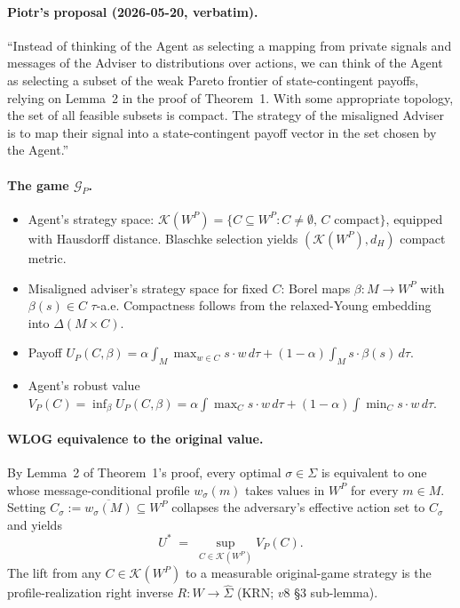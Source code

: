 \documentclass[11pt]{article}
\theoremstyle{definition}
\theoremstyle{remark}
\newcommand{\Si}{\Sigma}
\newcommand{\K}{\mathcal{K}}
\begin{document}
\paragraph{Piotr's proposal (2026-05-20, verbatim).} ``Instead of
thinking of the Agent as selecting a mapping from private signals and
messages of the Adviser to distributions over actions, we can think of
the Agent as selecting a subset of the weak Pareto frontier of
state-contingent payoffs, relying on Lemma~2 in the proof of
Theorem~1. With some appropriate topology, the set of all feasible
subsets is compact. The strategy of the misaligned Adviser is to map
their signal into a state-contingent payoff vector in the set chosen
by the Agent.''

\paragraph{The game $\mathcal G_P$.}
\begin{itemize}[leftmargin=*]
  \item Agent's strategy space: $\K(W^P) = \{C\subseteq W^P : C\ne\emptyset,\,C\text{ compact}\}$,
    equipped with Hausdorff distance. Blaschke selection yields
    $(\K(W^P), d_H)$ compact metric.
  \item Misaligned adviser's strategy space for fixed $C$: Borel maps
    $\beta:M\to W^P$ with $\beta(s)\in C$ $\tau$-a.e. Compactness follows
    from the relaxed-Young embedding into $\Delta(M\times C)$.
  \item Payoff $U_P(C,\beta) = \alpha\!\int_M\!\max_{w\in C}s\!\cdot w\,d\tau + (1-\alpha)\!\int_M s\!\cdot\beta(s)\,d\tau$.
  \item Agent's robust value $V_P(C) = \inf_\beta U_P(C,\beta) = \alpha\!\int\max_C s\!\cdot w\,d\tau + (1-\alpha)\!\int\min_C s\!\cdot w\,d\tau$.
\end{itemize}

\paragraph{WLOG equivalence to the original value.}
By Lemma~2 of Theorem~1's proof, every optimal $\sigma\in\Si$ is
equivalent to one whose message-conditional profile $w_\sigma(m)$ takes
values in $W^P$ for every $m\in M$. Setting $C_\sigma := \overline{w_\sigma(M)}\subseteq W^P$
collapses the adversary's effective action set to $C_\sigma$ and yields
\begin{equation}\label{eq:wlog}
  U^* \;=\; \sup_{C\in\K(W^P)}V_P(C).
\end{equation}
The lift from any $C\in\K(W^P)$ to a measurable original-game strategy
is the profile-realization right inverse $R:W\to\hat\Si$ (KRN; $v8$
\S3 sub-lemma).
\end{document}
